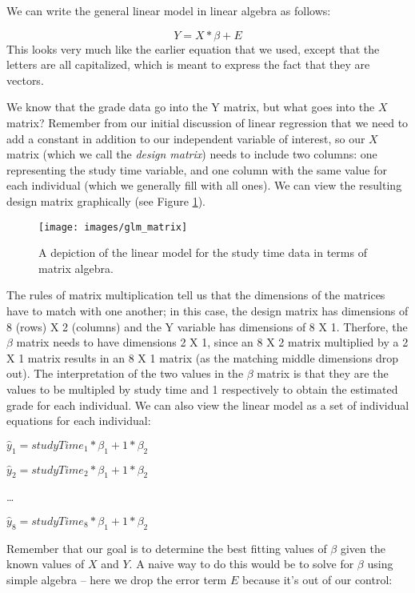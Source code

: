 \documentclass[]{book}
\theoremstyle{definition}
\theoremstyle{definition}
\theoremstyle{definition}
\theoremstyle{remark}
\begin{document}
We can write the general linear model in linear algebra as follows:

\[
Y = X*\beta + E
\] This looks very much like the earlier equation that we used, except
that the letters are all capitalized, which is meant to express the fact
that they are vectors.

We know that the grade data go into the Y matrix, but what goes into the
\(X\) matrix? Remember from our initial discussion of linear regression
that we need to add a constant in addition to our independent variable
of interest, so our \(X\) matrix (which we call the \emph{design
matrix}) needs to include two columns: one representing the study time
variable, and one column with the same value for each individual (which
we generally fill with all ones). We can view the resulting design
matrix graphically (see Figure \ref{fig:GLMmatrix}).

\begin{figure}
\texttt{[image: images/glm\_matrix]} \caption{A depiction of the linear model for the study time data in terms of matrix algebra.}\label{fig:GLMmatrix}
\end{figure}

The rules of matrix multiplication tell us that the dimensions of the
matrices have to match with one another; in this case, the design matrix
has dimensions of 8 (rows) X 2 (columns) and the Y variable has
dimensions of 8 X 1. Therfore, the \(\beta\) matrix needs to have
dimensions 2 X 1, since an 8 X 2 matrix multiplied by a 2 X 1 matrix
results in an 8 X 1 matrix (as the matching middle dimensions drop out).
The interpretation of the two values in the \(\beta\) matrix is that
they are the values to be multipled by study time and 1 respectively to
obtain the estimated grade for each individual. We can also view the
linear model as a set of individual equations for each individual:

\(\hat{y}_1 = studyTime_1*\beta_1 + 1*\beta_2\)

\(\hat{y}_2 = studyTime_2*\beta_1 + 1*\beta_2\)

\ldots{}

\(\hat{y}_8 = studyTime_8*\beta_1 + 1*\beta_2\)

Remember that our goal is to determine the best fitting values of
\(\beta\) given the known values of \(X\) and \(Y\). A naive way to do
this would be to solve for \(\beta\) using simple algebra -- here we
drop the error term \(E\) because it's out of our control:
\end{document}
